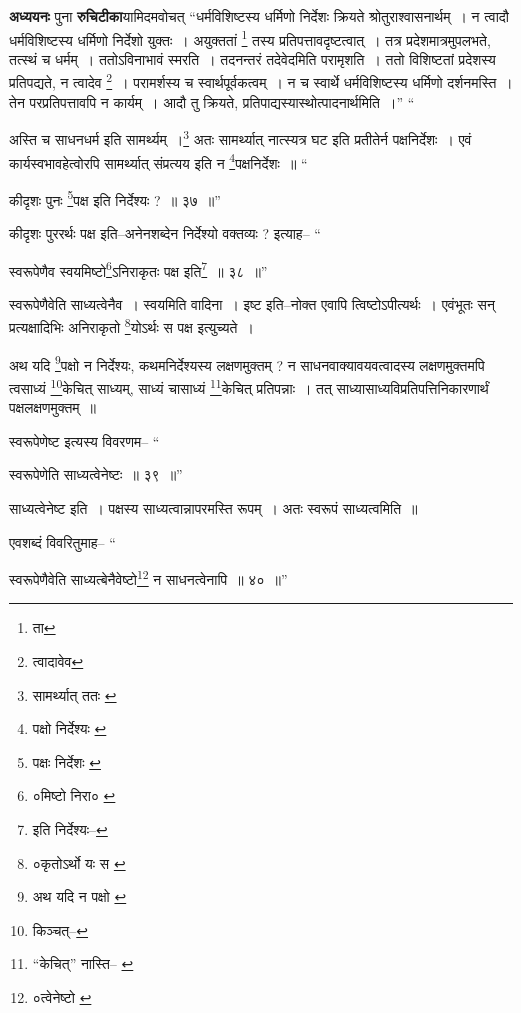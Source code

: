 \documentclass[article,12pt,a4paper]{memoir}
\begin{document}
	  \pstart \textbf{अध्ययनः} पुना \textbf{रुचिटीका}यामिदमवोचत् “धर्मविशिष्टस्य धर्मिणो निर्देशः क्रियते श्रोतुराश्वासनार्थम् । न त्वादौ धर्मविशिष्टस्य धर्मिणो निर्देशो युक्तः । अयुक्ततां \footnote{ता} तस्य प्रतिपत्तावदृष्टत्वात् । तत्र प्रदेशमात्रमुपलभते, तत्स्थं च धर्मम् । ततोऽविनाभावं स्मरति । तदनन्तरं तदेवेदमिति परामृशति । ततो विशिष्टतां प्रदेशस्य प्रतिपद्यते, न त्वादेव \footnote{त्वादावेव} । परामर्शस्य च स्वार्थपूर्वकत्वम् । न च स्वार्थे धर्मविशिष्टस्य धर्मिणो दर्शनमस्ति । तेन परप्रतिपत्तावपि न कार्यम् । आदौ तु क्रियते, प्रतिपाद्यस्यास्थोत्पादनार्थमिति ।” \leavevmode{} “
	  
	अस्ति च साधनधर्म इति सामर्थ्यम् ।\footnote{सामर्थ्यात् ततः \cite{dp-msA} \cite{dp-msB} \cite{dp-edP} \cite{dp-edH} \cite{dp-edN}} अतः सामर्थ्यात् नात्स्यत्र घट इति प्रतीतेर्न पक्षनिर्देशः । एवं कार्यस्वभावहेत्वोरपि सामर्थ्यात् संप्रत्यय इति न \footnote{पक्षो निर्देश्यः \cite{dp-edE}}\-पक्षनिर्देशः ॥ “
	  
	कीदृशः पुनः \footnote{पक्षः निर्देशः \cite{dp-msC}}\-पक्ष इति निर्देश्यः ? ॥ ३७ ॥” 
	  
	कीदृशः पुररर्थः पक्ष इति--अनेनशब्देन निर्देश्यो वक्तव्यः ? इत्याह-- “
	  
	स्वरूपेणैव स्वयमिष्टो\footnote{०मिष्टो निरा० \cite{dp-msB} \cite{dp-edP}}\-ऽनिराकृतः पक्ष इति\footnote{इति निर्देश्यः--\cite{dp-msC}} ॥ ३८ ॥” 
	  
	स्वरूपेणैवेति साध्यत्वेनैव । स्वयमिति वादिना । इष्ट इति--नोक्त एवापि त्विष्टोऽपीत्यर्थः । एवंभूतः सन् प्रत्यक्षादिभिः अनिराकृतो \footnote{०कृतोऽर्थो यः स \cite{dp-msB} \cite{dp-msC} \cite{dp-msD}}\-योऽर्थः स पक्ष इत्युच्यते । 
	  
	अथ यदि \footnote{अथ यदि न पक्षो \cite{dp-msA} \cite{dp-msB} \cite{dp-edP} \cite{dp-edH} \cite{dp-edE} \cite{dp-edN}}\-पक्षो न निर्देश्यः, कथमनिर्देश्यस्य लक्षणमुक्तम् ? न साधनवाक्यावयवत्वादस्य लक्षणमुक्तमपि त्वसाध्यं \footnote{किञ्चत्--\cite{dp-msB}}\-केचित् साध्यम्, साध्यं चासाध्यं \footnote{“केचित्” नास्ति--\cite{dp-msC} \cite{dp-msA} \cite{dp-edP} \cite{dp-edH} \cite{dp-edE} \cite{dp-edN}}\-केचित् प्रतिपन्नाः । तत् साध्यासाध्यविप्रतिपत्तिनिकारणार्थं पक्षलक्षणमुक्तम् ॥ 
	  
	स्वरूपेणेष्ट इत्यस्य विवरणम-- “
	  
	स्वरूपेणेति साध्यत्वेनेष्टः ॥ ३९ ॥” 
	  
	साध्यत्वेनेष्ट इति । पक्षस्य साध्यत्वान्नापरमस्ति रूपम् । अतः स्वरूपं साध्यत्वमिति ॥ 
	  
	एवशब्दं विवरितुमाह-- “
	  
	स्वरूपेणैवेति साध्यत्बेनैवेष्टो\footnote{०त्वेनेष्टो \cite{dp-msC} \cite{dp-msB} \cite{dp-edH} \cite{dp-edP} \cite{dp-edE} \cite{dp-edN}} न साधनत्वेनापि ॥ ४० ॥” 
	  
\end{document}
